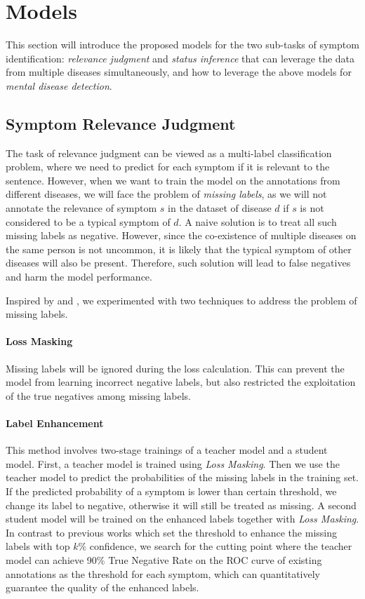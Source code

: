 \section{Models}

This section will introduce the proposed models for the two sub-tasks of symptom identification: \textit{relevance judgment} and \textit{status inference} that can leverage the data from multiple diseases simultaneously, and how to leverage the above models for \textit{mental disease detection}.

\subsection{Symptom Relevance Judgment}
\label{sec:model_rel}
The task of relevance judgment can be viewed as a multi-label classification problem, where we need to predict for each symptom if it is relevant to the sentence. However, when we want to train the model on the annotations from different diseases, we will face the problem of \textit{missing labels}, as we will not annotate the relevance of symptom $s$ in the dataset of disease $d$ if $s$ is not considered to be a typical symptom of $d$. A naive solution is to treat all such missing labels as negative. However, since the 
co-existence of multiple diseases on the same person is not uncommon, it is likely that the 
typical symptom of other diseases will also be present. Therefore, 
such solution will lead to false negatives and harm the model performance. 

Inspired by \citet{fonseca2020addressing} and \citet{gururani2021semi}, we experimented with two techniques to address the problem of missing labels.

\paragraph{Loss Masking} Missing labels will be ignored during the loss calculation. This can prevent the model from learning incorrect negative labels, but also restricted the exploitation of the true negatives among missing labels.

\paragraph{Label Enhancement} This method involves two-stage trainings of a teacher model and a student model. First, a teacher model is trained using \textit{Loss Masking}. Then we use the teacher model to predict the probabilities of the missing labels in the training set. If the predicted probability of a symptom is lower than certain threshold, we change its label to negative, otherwise it will still be treated as missing. A second student model will be trained on the enhanced labels together with \textit{Loss Masking}. In contrast to previous works which set the threshold to enhance the missing labels with top $k\%$ confidence, we search for the cutting point where the teacher model can achieve 90\% True Negative Rate on the ROC curve of existing annotations as the threshold for each symptom, which can quantitatively guarantee the quality of the enhanced labels.


